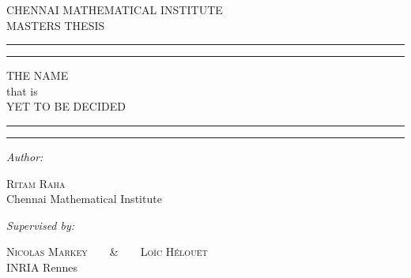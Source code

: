 \documentclass[a4paper, 11pt, oneside]{book}
\theoremstyle{definition}
\begin{document}
\begin{titlepage}
	\centering
	\scshape 
	{\LARGE{CHENNAI MATHEMATICAL INSTITUTE}}\\
          \vskip 0.5cm
	MASTERS THESIS
	\vspace*{\baselineskip} 
	
	\rule{\textwidth}{1.6pt}\vspace*{-\baselineskip}\vspace*{2pt}
	\rule{\textwidth}{0.4pt} 

	\vspace{0.75\baselineskip}
	
	{\LARGE THE NAME\\ that is \\ YET TO BE DECIDED\\} 
	
	\vspace{0.75\baselineskip} 
	
	\rule{\textwidth}{0.4pt}\vspace*{-\baselineskip}\vspace{3.2pt} 
	\rule{\textwidth}{1.6pt}
	
	\vspace{2\baselineskip} 
	
	
	
	
	\textit{Author:}
	
	\vspace{0.5\baselineskip} 
	
	{\scshape\Large Ritam Raha}\\ %
	\vspace{0.2\baselineskip}
	{\small Chennai Mathematical Institute}
	\vspace{2\baselineskip} 

		
	\textit{Supervised by:}     
	\vspace{0.5\baselineskip}

	{\scshape\Large Nicolas Markey}\ \ \ \ \&\ \ \ \  {\scshape\Large Loïc Hélouët}\\ %
	\vspace{0.2\baselineskip}
	{\small INRIA Rennes}
	\vspace{2\baselineskip}

	\vspace{2\baselineskip} 
	

\end{titlepage}
\end{document}
